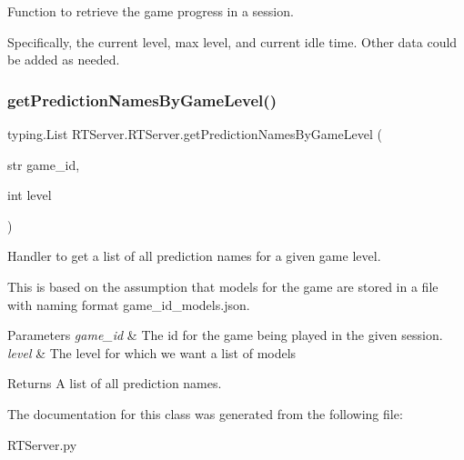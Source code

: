 Function to retrieve the game progress in a session. 

Specifically, the current level, max level, and current idle time. Other data could be added as needed. \mbox{\label{class_r_t_server_1_1_r_t_server_a53ed74b50b616e1db6094a9ae62243f5}} 
\subsubsection{\texorpdfstring{getPredictionNamesByGameLevel()}{getPredictionNamesByGameLevel()}}
{\footnotesize\ttfamily  typing.\+List R\+T\+Server.\+R\+T\+Server.\+get\+Prediction\+Names\+By\+Game\+Level (\begin{DoxyParamCaption}\item[{str}]{game\+\_\+id,  }\item[{int}]{level }\end{DoxyParamCaption})\hspace{0.3cm}{\ttfamily [static]}}



Handler to get a list of all prediction names for a given game level. 

This is based on the assumption that models for the game are stored in a file with naming format game\+\_\+id\+\_\+models.\+json. 
\begin{DoxyParams}{Parameters}
{\em game\+\_\+id} & The id for the game being played in the given session. \\
\hline
{\em level} & The level for which we want a list of models \\
\hline
\end{DoxyParams}
\begin{DoxyReturn}{Returns}
A list of all prediction names. 
\end{DoxyReturn}


The documentation for this class was generated from the following file\+:\begin{DoxyCompactItemize}
\item 
R\+T\+Server.\+py\end{DoxyCompactItemize}
